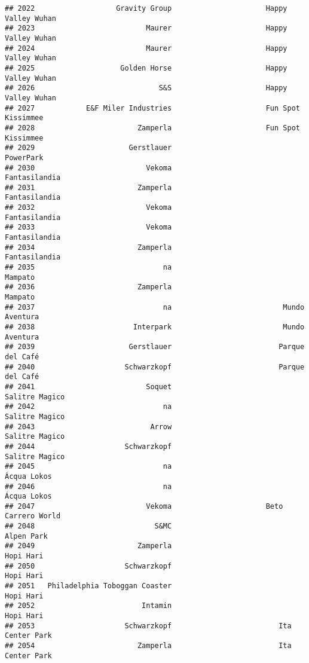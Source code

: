\documentclass[
]{article}
\begin{document}
\begin{verbatim}
## 2022                   Gravity Group                      Happy Valley Wuhan
## 2023                          Maurer                      Happy Valley Wuhan
## 2024                          Maurer                      Happy Valley Wuhan
## 2025                    Golden Horse                      Happy Valley Wuhan
## 2026                             S&S                      Happy Valley Wuhan
## 2027            E&F Miler Industries                      Fun Spot Kissimmee
## 2028                        Zamperla                      Fun Spot Kissimmee
## 2029                      Gerstlauer                               PowerPark
## 2030                          Vekoma                           Fantasilandia
## 2031                        Zamperla                           Fantasilandia
## 2032                          Vekoma                           Fantasilandia
## 2033                          Vekoma                           Fantasilandia
## 2034                        Zamperla                           Fantasilandia
## 2035                              na                                 Mampato
## 2036                        Zamperla                                 Mampato
## 2037                              na                          Mundo Aventura
## 2038                       Interpark                          Mundo Aventura
## 2039                      Gerstlauer                         Parque del Café
## 2040                     Schwarzkopf                         Parque del Café
## 2041                          Soquet                          Salitre Magico
## 2042                              na                          Salitre Magico
## 2043                           Arrow                          Salitre Magico
## 2044                     Schwarzkopf                          Salitre Magico
## 2045                              na                             Ácqua Lokos
## 2046                              na                             Ácqua Lokos
## 2047                          Vekoma                      Beto Carrero World
## 2048                            S&MC                              Alpen Park
## 2049                        Zamperla                               Hopi Hari
## 2050                     Schwarzkopf                               Hopi Hari
## 2051   Philadelphia Toboggan Coaster                               Hopi Hari
## 2052                         Intamin                               Hopi Hari
## 2053                     Schwarzkopf                         Ita Center Park
## 2054                        Zamperla                         Ita Center Park

\end{verbatim}
\end{document}
